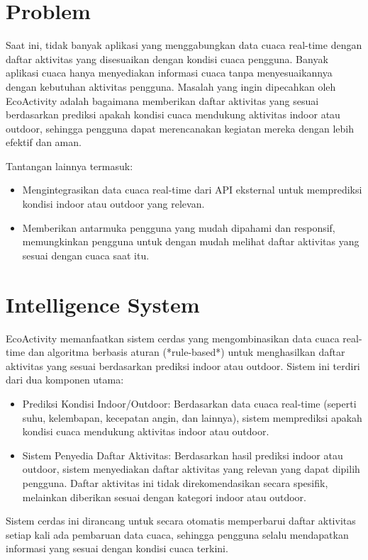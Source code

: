 \documentclass[journal,article,submit,pdftex,moreauthors]{Definitions/mdpi}
\begin{document}
\section{Problem}

Saat ini, tidak banyak aplikasi yang menggabungkan data cuaca real-time dengan daftar aktivitas yang disesuaikan dengan kondisi cuaca pengguna. Banyak aplikasi cuaca hanya menyediakan informasi cuaca tanpa menyesuaikannya dengan kebutuhan aktivitas pengguna. Masalah yang ingin dipecahkan oleh EcoActivity adalah bagaimana memberikan daftar aktivitas yang sesuai berdasarkan prediksi apakah kondisi cuaca mendukung aktivitas indoor atau outdoor, sehingga pengguna dapat merencanakan kegiatan mereka dengan lebih efektif dan aman.

Tantangan lainnya termasuk:
\begin{itemize}
    \item Mengintegrasikan data cuaca real-time dari API eksternal untuk memprediksi kondisi indoor atau outdoor yang relevan.
    \item Memberikan antarmuka pengguna yang mudah dipahami dan responsif, memungkinkan pengguna untuk dengan mudah melihat daftar aktivitas yang sesuai dengan cuaca saat itu.
\end{itemize}
\section{Intelligence System}

EcoActivity memanfaatkan sistem cerdas yang mengombinasikan data cuaca real-time dan algoritma berbasis aturan (*rule-based*) untuk menghasilkan daftar aktivitas yang sesuai berdasarkan prediksi indoor atau outdoor. Sistem ini terdiri dari dua komponen utama:
\begin{itemize}
    \item Prediksi Kondisi Indoor/Outdoor: Berdasarkan data cuaca real-time (seperti suhu, kelembapan, kecepatan angin, dan lainnya), sistem memprediksi apakah kondisi cuaca mendukung aktivitas indoor atau outdoor.
    \item Sistem Penyedia Daftar Aktivitas: Berdasarkan hasil prediksi indoor atau outdoor, sistem menyediakan daftar aktivitas yang relevan yang dapat dipilih pengguna. Daftar aktivitas ini tidak direkomendasikan secara spesifik, melainkan diberikan sesuai dengan kategori indoor atau outdoor.
\end{itemize}

Sistem cerdas ini dirancang untuk secara otomatis memperbarui daftar aktivitas setiap kali ada pembaruan data cuaca, sehingga pengguna selalu mendapatkan informasi yang sesuai dengan kondisi cuaca terkini.
\end{document}
